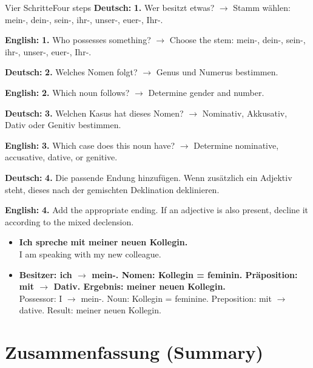 \documentclass[a4paper,11pt]{article}
\newcommand{\GermanText}[1]{\textbf{Deutsch: }#1\par}
\newcommand{\EnglishText}[1]{{\small\color{SoftGray}\textbf{English: }#1\par}}
\newcommand{\ExampleItem}[2]{\item \textbf{#1}\\{\small\color{SoftGray}#2}}
\begin{document}
\begin{grammarentry}{Vier Schritte}{Four steps}
\GermanText{\textbf{1.} Wer besitzt etwas? $\rightarrow$ Stamm wählen: mein-, dein-, sein-, ihr-, unser-, euer-, Ihr-.}
\EnglishText{\textbf{1.} Who possesses something? $\rightarrow$ Choose the stem: mein-, dein-, sein-, ihr-, unser-, euer-, Ihr-.}

\GermanText{\textbf{2.} Welches Nomen folgt? $\rightarrow$ Genus und Numerus bestimmen.}
\EnglishText{\textbf{2.} Which noun follows? $\rightarrow$ Determine gender and number.}

\GermanText{\textbf{3.} Welchen Kasus hat dieses Nomen? $\rightarrow$ Nominativ, Akkusativ, Dativ oder Genitiv bestimmen.}
\EnglishText{\textbf{3.} Which case does this noun have? $\rightarrow$ Determine nominative, accusative, dative, or genitive.}

\GermanText{\textbf{4.} Die passende Endung hinzufügen. Wenn zusätzlich ein Adjektiv steht, dieses nach der gemischten Deklination deklinieren.}
\EnglishText{\textbf{4.} Add the appropriate ending. If an adjective is also present, decline it according to the mixed declension.}
\end{grammarentry}

\begin{exbox}
\begin{itemize}
\ExampleItem{Ich spreche mit meiner neuen Kollegin.}{I am speaking with my new colleague.}
\ExampleItem{Besitzer: ich $\rightarrow$ mein-. Nomen: Kollegin = feminin. Präposition: mit $\rightarrow$ Dativ. Ergebnis: meiner neuen Kollegin.}{Possessor: I $\rightarrow$ mein-. Noun: Kollegin = feminine. Preposition: mit $\rightarrow$ dative. Result: meiner neuen Kollegin.}
\end{itemize}
\end{exbox}

\section{Zusammenfassung \textnormal{(Summary)}}
\end{document}
